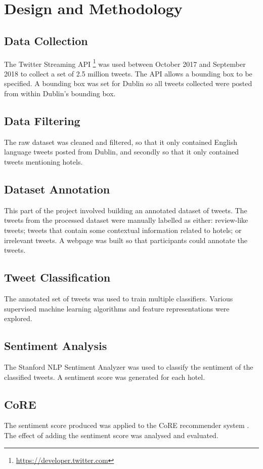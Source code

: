 \section{Design and Methodology}

\subsection{Data Collection}
The Twitter Streaming API \footnote{\url{https://developer.twitter.com}} was used between October 2017 and September 2018 to collect a set of 2.5 million tweets. The API allows a bounding box to be specified. A bounding box was set for Dublin so all tweets collected were posted from within Dublin's bounding box.
\subsection{Data Filtering}
The raw dataset was cleaned and filtered, so that it only contained English language tweets posted from Dublin, and secondly so that it only contained tweets mentioning hotels.
\subsection{Dataset Annotation}
This part of the project involved building an annotated dataset of tweets. The tweets from the processed dataset were manually labelled as either: review-like tweets; tweets that contain some contextual information related to hotels; or irrelevant tweets. A webpage was built so that participants could annotate the tweets.
\subsection{Tweet Classification}
The annotated set of tweets was used to train multiple classifiers. Various supervised machine learning algorithms and feature representations were explored.
\subsection{Sentiment Analysis}
The Stanford NLP Sentiment Analyzer \cite{stanfordSentiment2013} was used to classify the sentiment of the classified tweets. A sentiment score was generated for each hotel.
\subsection{CoRE}
The sentiment score produced was applied to the CoRE recommender system \cite{core2019}. The effect of adding the sentiment score was analysed and evaluated.